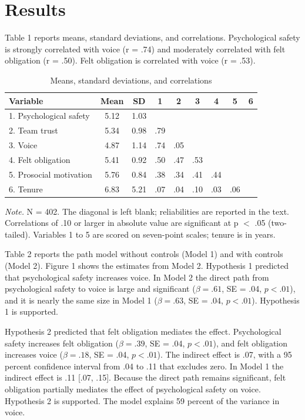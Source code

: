 \documentclass[12pt]{article}
\begin{document}
\section{Results}

Table 1 reports means, standard deviations, and correlations. Psychological safety is strongly correlated with voice (r = .74) and moderately correlated with felt obligation (r = .50). Felt obligation is correlated with voice (r = .53).

\begin{table}[p]
\centering
\begin{threeparttable}
\caption{Means, standard deviations, and correlations}
\label{tab:corr}
\begin{tabular}{lcccccccc}
\toprule
Variable & Mean & SD & 1 & 2 & 3 & 4 & 5 & 6 \\
\midrule
1. Psychological safety & 5.12 & 1.03 &  &  &  &  &  &  \\
2. Team trust & 5.34 & 0.98 & .79 &  &  &  &  &  \\
3. Voice & 4.87 & 1.14 & .74 & .05 &  &  &  &  \\
4. Felt obligation & 5.41 & 0.92 & .50 & .47 & .53 &  &  &  \\
5. Prosocial motivation & 5.76 & 0.84 & .38 & .34 & .41 & .44 &  &  \\
6. Tenure & 6.83 & 5.21 & .07 & .04 & .10 & .03 & .06 &  \\
\bottomrule
\end{tabular}
\begin{tablenotes}\footnotesize
\item \textit{Note.} N = 402. The diagonal is left blank; reliabilities are reported in the text. Correlations of .10 or larger in absolute value are significant at p $<$ .05 (two-tailed). Variables 1 to 5 are scored on seven-point scales; tenure is in years.
\end{tablenotes}
\end{threeparttable}
\end{table}

Table 2 reports the path model without controls (Model 1) and with controls (Model 2). Figure 1 shows the estimates from Model 2. Hypothesis 1 predicted that psychological safety increases voice. In Model 2 the direct path from psychological safety to voice is large and significant ($\beta = .61$, SE = .04, $p < .01$), and it is nearly the same size in Model 1 ($\beta = .63$, SE = .04, $p < .01$). Hypothesis 1 is supported.

Hypothesis 2 predicted that felt obligation mediates the effect. Psychological safety increases felt obligation ($\beta = .39$, SE = .04, $p < .01$), and felt obligation increases voice ($\beta = .18$, SE = .04, $p < .01$). The indirect effect is .07, with a 95 percent confidence interval from .04 to .11 that excludes zero. In Model 1 the indirect effect is .11 [.07, .15]. Because the direct path remains significant, felt obligation partially mediates the effect of psychological safety on voice. Hypothesis 2 is supported. The model explains 59 percent of the variance in voice.
\end{document}
